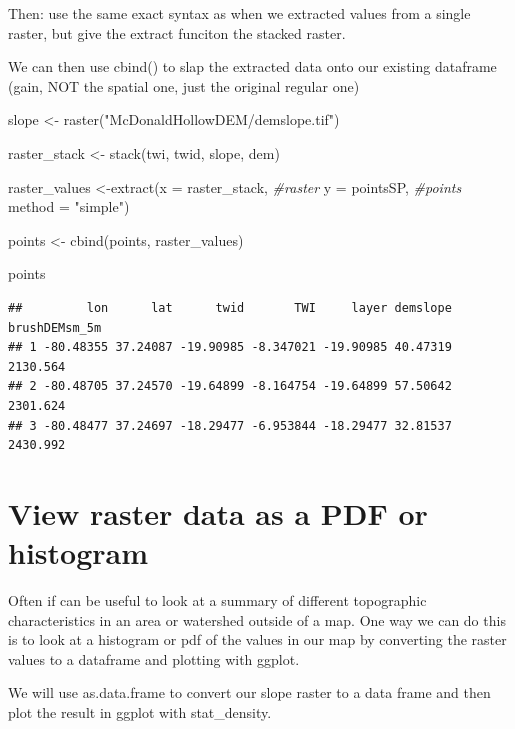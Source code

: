 \documentclass[
]{book}
\newenvironment{Shaded}{\begin{snugshade}}{\end{snugshade}}
\newcommand{\AttributeTok}[1]{\textcolor[rgb]{0.77,0.63,0.00}{#1}}
\newcommand{\CommentTok}[1]{\textcolor[rgb]{0.56,0.35,0.01}{\textit{#1}}}
\newcommand{\FunctionTok}[1]{\textcolor[rgb]{0.00,0.00,0.00}{#1}}
\newcommand{\NormalTok}[1]{#1}
\newcommand{\OtherTok}[1]{\textcolor[rgb]{0.56,0.35,0.01}{#1}}
\newcommand{\StringTok}[1]{\textcolor[rgb]{0.31,0.60,0.02}{#1}}
\begin{document}
Then: use the same exact syntax as when we extracted values from a single raster, but give the extract funciton the stacked raster.

We can then use cbind() to slap the extracted data onto our existing dataframe (gain, NOT the spatial one, just the original regular one)

\begin{Shaded}
\begin{Highlighting}[]
\NormalTok{slope }\OtherTok{\textless{}{-}} \FunctionTok{raster}\NormalTok{(}\StringTok{"McDonaldHollowDEM/demslope.tif"}\NormalTok{)}

\NormalTok{raster\_stack }\OtherTok{\textless{}{-}} \FunctionTok{stack}\NormalTok{(twi, twid, slope, dem)}

\NormalTok{raster\_values }\OtherTok{\textless{}{-}}\FunctionTok{extract}\NormalTok{(}\AttributeTok{x =}\NormalTok{ raster\_stack, }\CommentTok{\#raster }
                 \AttributeTok{y =}\NormalTok{ pointsSP, }\CommentTok{\#points}
                 \AttributeTok{method =} \StringTok{"simple"}\NormalTok{)}

\NormalTok{points }\OtherTok{\textless{}{-}} \FunctionTok{cbind}\NormalTok{(points, raster\_values)}

\NormalTok{points}
\end{Highlighting}
\end{Shaded}

\begin{verbatim}
##         lon      lat      twid       TWI     layer demslope brushDEMsm_5m
## 1 -80.48355 37.24087 -19.90985 -8.347021 -19.90985 40.47319      2130.564
## 2 -80.48705 37.24570 -19.64899 -8.164754 -19.64899 57.50642      2301.624
## 3 -80.48477 37.24697 -18.29477 -6.953844 -18.29477 32.81537      2430.992
\end{verbatim}

\hypertarget{view-raster-data-as-a-pdf-or-histogram}{%
\section{View raster data as a PDF or histogram}\label{view-raster-data-as-a-pdf-or-histogram}}

Often if can be useful to look at a summary of different topographic characteristics in an area or watershed outside of a map. One way we can do this is to look at a histogram or pdf of the values in our map by converting the raster values to a dataframe and plotting with ggplot.

We will use as.data.frame to convert our slope raster to a data frame and then plot the result in ggplot with stat\_density.
\end{document}
